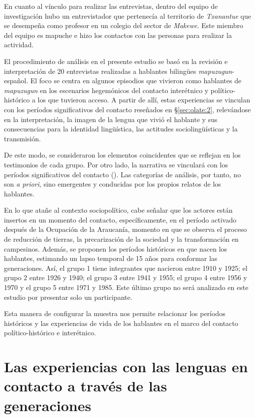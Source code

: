 \documentclass[output=paper]{../langscibook}
\begin{document}
En cuanto al vínculo para realizar las entrevistas, dentro del equipo de investigación hubo un entrevistador que pertenecía al territorio de \textit{Txanantue} que se desempeña como profesor en un colegio del sector de \textit{Makewe}. Este miembro del equipo es mapuche e hizo los contactos con las personas para realizar la actividad.

El procedimiento de análisis en el presente estudio se basó en la revisión e interpretación de 20 entrevistas realizadas a hablantes bilingües \textit{mapuzugun}{}-español. El foco se centra en algunos episodios que vivieron como hablantes de \textit{mapuzugun} en los escenarios hegemónicos del contacto interétnico y político-histórico a los que tuvieron acceso. A partir de allí, estas experiencias se vinculan con los períodos significativos del contacto reseñados en §\ref{sec:olate:2}, relevándose en la interpretación, la imagen de la lengua que vivió el hablante y sus consecuencias para la identidad lingüística, las actitudes sociolingüísticas y la transmisión.

De este modo, se consideraron los elementos coincidentes que se reflejan en los testimonios de cada grupo. Por otro lado, la narrativa se vinculará con los períodos significativos del contacto (\citealt{OlateVinetWittigGonzález2019}). Las categorías de análisis, por tanto, no son \textit{a priori}, sino emergentes y conducidas por los propios relatos de los hablantes.

En lo que atañe al contexto sociopolítico, cabe señalar que los actores están insertos en un momento del contacto, específicamente, en el período activado después de la Ocupación de la Araucanía, momento en que se observa el proceso de reducción de tierras, la precarización de la sociedad y la transformación en campesinos. Además, se proponen los períodos históricos en que nacen los hablantes, estimando un lapso temporal de 15 años para conformar las generaciones. Así, el grupo 1 tiene integrantes que nacieron entre 1910 y 1925; el grupo 2 entre 1926 y 1940; el grupo 3 entre 1941 y 1955; el grupo 4 entre 1956 y 1970 y el grupo 5 entre 1971 y 1985. Este último grupo no será analizado en este estudio por presentar solo un participante.

Esta manera de configurar la muestra nos permite relacionar los períodos históricos y las experiencias de vida de los hablantes en el marco del contacto político-histórico e interétnico. 


\section{Las experiencias con las lenguas en contacto a través de las generaciones}\label{sec:olate:5}
\end{document}

